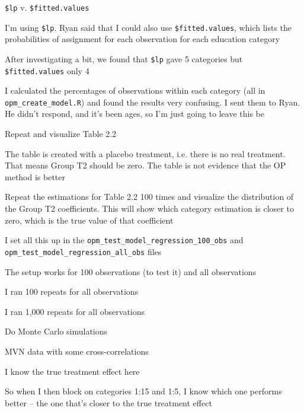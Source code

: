 \begin{coi}
\begin{coi}
			\end{coi}
		\item \texttt{\$lp} v. \texttt{\$fitted.values}
			\begin{coi}
				\item I'm using \texttt{\$lp}. Ryan said that I could also use \texttt{\$fitted.values}, which lists the probabilities of assignment for each observation for each education category
				\item After investigating a bit, we found that \texttt{\$lp} gave 5 categories but \texttt{\$fitted.values} only 4
				\item I calculated the percentages of observations within each category (all in \texttt{opm\_create\_model.R}) and found the results very confusing. I sent them to Ryan. He didn't respond, and it's been ages, so I'm just going to leave this be
			\end{coi}
		\item Repeat and visualize Table 2.2
			\begin{coi}
				\item The table is created with a placebo treatment, i.e. there is no real treatment. That means Group T2 should be zero. The table is not evidence that the OP method is better
				\item Repeat the estimations for Table 2.2 100 times and visualize the distribution of the Group T2 coefficients. This will show which category estimation is closer to zero, which is the true value of that coefficient
				\item I set all this up in the \texttt{opm\_test\_model\_regression\_100\_obs} and\\ \texttt{opm\_test\_model\_regression\_all\_obs} files
				\item The setup works for 100 observations (to test it) and all observations
				\item I ran 100 repeats for all observations
				\item I ran 1,000 repeats for all observations
			\end{coi} 
		\item Do Monte Carlo simulations
			\begin{coi}
				\item MVN data with some cross-correlations
				\item I know the true treatment effect here
				\item So when I then block on categories 1:15 and 1:5, I know which one performs better -- the one that's closer to the true treatment effect

\end{coi}
\end{coi}
